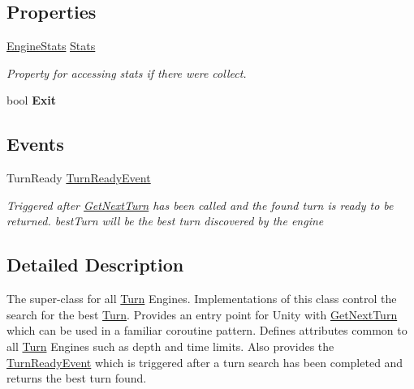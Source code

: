 \subsection*{Properties}
\begin{DoxyCompactItemize}
\item 
\hyperlink{class_universal_turn_based_a_i_1_1_engine_stats}{Engine\+Stats} \hyperlink{class_universal_turn_based_a_i_1_1_turn_engine_a2588f0e4a11f2c96613e72c890e39138}{Stats}
\begin{DoxyCompactList}\small\item\em Property for accessing stats if there were collect. \end{DoxyCompactList}\item 
\hypertarget{class_universal_turn_based_a_i_1_1_turn_engine_aa96090059f46e1c54a9e7edde40c9f2d}{}bool {\bfseries Exit}\label{class_universal_turn_based_a_i_1_1_turn_engine_aa96090059f46e1c54a9e7edde40c9f2d}

\end{DoxyCompactItemize}
\subsection*{Events}
\begin{DoxyCompactItemize}
\item 
Turn\+Ready \hyperlink{class_universal_turn_based_a_i_1_1_turn_engine_af10115494121382d2966a8fc9fe4c9a0}{Turn\+Ready\+Event}
\begin{DoxyCompactList}\small\item\em Triggered after \hyperlink{class_universal_turn_based_a_i_1_1_turn_engine_ae2a5b877b8194f05dc970226722515ee}{Get\+Next\+Turn} has been called and the found turn is ready to be returned. best\+Turn will be the best turn discovered by the engine \end{DoxyCompactList}\end{DoxyCompactItemize}


\subsection{Detailed Description}
The super-\/class for all \hyperlink{class_universal_turn_based_a_i_1_1_turn}{Turn} Engines. Implementations of this class control the search for the best \hyperlink{class_universal_turn_based_a_i_1_1_turn}{Turn}. Provides an entry point for Unity with \hyperlink{class_universal_turn_based_a_i_1_1_turn_engine_ae2a5b877b8194f05dc970226722515ee}{Get\+Next\+Turn} which can be used in a familiar coroutine pattern. Defines attributes common to all \hyperlink{class_universal_turn_based_a_i_1_1_turn}{Turn} Engines such as depth and time limits. Also provides the \hyperlink{class_universal_turn_based_a_i_1_1_turn_engine_af10115494121382d2966a8fc9fe4c9a0}{Turn\+Ready\+Event} which is triggered after a turn search has been completed and returns the best turn found. 

